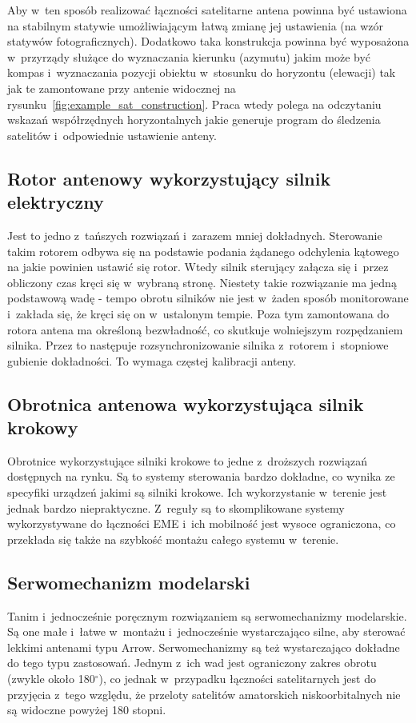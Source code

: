 \documentclass[eng,oneside]{mgr}
\begin{document}
			Aby w~ten sposób realizować łączności satelitarne antena powinna być ustawiona na stabilnym statywie umożliwiającym łatwą zmianę jej ustawienia (na wzór statywów fotograficznych). Dodatkowo taka konstrukcja powinna być wyposażona w~przyrządy służące do wyznaczania kierunku (azymutu) jakim może być kompas i~wyznaczania pozycji obiektu w~stosunku do horyzontu (elewacji) tak jak te zamontowane przy antenie widocznej na rysunku~\ref{fig:example_sat_construction}. Praca wtedy polega na odczytaniu wskazań współrzędnych horyzontalnych jakie generuje program do śledzenia satelitów i~odpowiednie ustawienie anteny.

			\subsection{Rotor antenowy wykorzystujący silnik elektryczny}
			Jest to jedno z~tańszych rozwiązań i~zarazem mniej dokładnych. Sterowanie takim rotorem odbywa się na podstawie podania żądanego odchylenia kątowego na jakie powinien ustawić się rotor. Wtedy silnik sterujący załącza się i~przez obliczony czas kręci się w~wybraną stronę. Niestety takie rozwiązanie ma jedną podstawową wadę - tempo obrotu silników nie jest w~żaden sposób monitorowane i~zakłada się, że kręci się on w~ustalonym tempie. Poza tym zamontowana do rotora antena ma określoną bezwładność, co skutkuje wolniejszym rozpędzaniem silnika. Przez to następuje rozsynchronizowanie silnika z~rotorem i~stopniowe gubienie dokładności. To wymaga częstej kalibracji anteny.

			\subsection{Obrotnica antenowa wykorzystująca silnik krokowy}
			Obrotnice wykorzystujące silniki krokowe to jedne z~droższych rozwiązań dostępnych na rynku. Są to systemy sterowania bardzo dokładne, co wynika ze specyfiki urządzeń jakimi są silniki krokowe. Ich wykorzystanie w~terenie jest jednak bardzo niepraktyczne. Z~reguły są to skomplikowane systemy wykorzystywane do łączności EME i~ich mobilność jest wysoce ograniczona, co przekłada się także na szybkość montażu całego systemu w~terenie.

			\subsection{Serwomechanizm modelarski}
			Tanim i~jednocześnie poręcznym rozwiązaniem są serwomechanizmy modelarskie. Są one małe i~łatwe w~montażu i~jednocześnie wystarczająco silne, aby sterować lekkimi antenami typu Arrow. Serwomechanizmy są też wystarczająco dokładne do tego typu zastosowań. Jednym z~ich wad jest ograniczony zakres obrotu (zwykle około 180$^{\circ}$), co jednak w~przypadku łączności satelitarnych jest do przyjęcia z~tego względu, że przeloty satelitów amatorskich niskoorbitalnych nie są widoczne powyżej 180 stopni.
		
\end{document}
